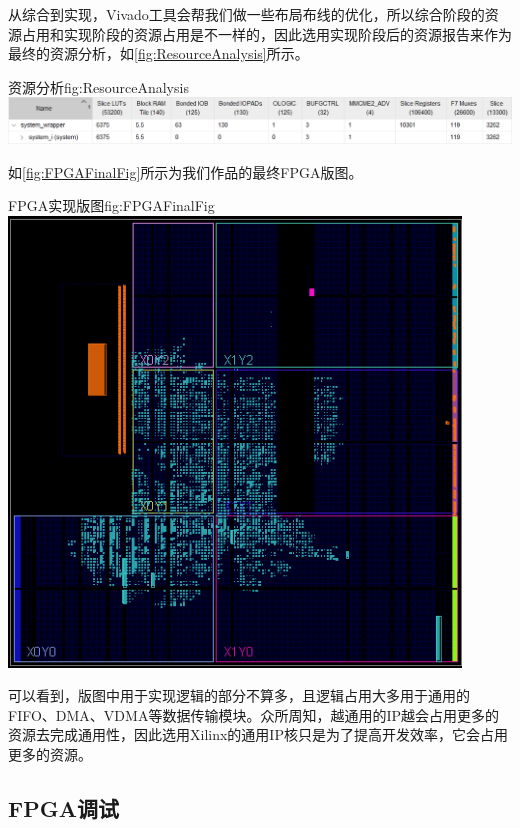 \documentclass[supercite]{HustGraduPaper}
\begin{document}
	从综合到实现，Vivado工具会帮我们做一些布局布线的优化，所以综合阶段的资源占用和实现阶段的资源占用是不一样的，因此选用实现阶段后的资源报告来作为最终的资源分析，如\autoref{fig:ResourceAnalysis}所示。
	
	\begin{generalfig}[htb]{资源分析}{fig:ResourceAnalysis}
		\includegraphics[width=\textwidth]{Figures/ResourceAnalysis.png}
	\end{generalfig}
	

	如\autoref{fig:FPGAFinalFig}所示为我们作品的最终FPGA版图。
	
	
	\begin{generalfig}[htb]{FPGA实现版图}{fig:FPGAFinalFig}
		\includegraphics[width=12cm]{Figures/FPGAFinalFig.png}
	\end{generalfig}

	可以看到，版图中用于实现逻辑的部分不算多，且逻辑占用大多用于通用的FIFO、DMA、VDMA等数据传输模块。众所周知，越通用的IP越会占用更多的资源去完成通用性，因此选用Xilinx的通用IP核只是为了提高开发效率，它会占用更多的资源。
	
	\subsection{FPGA调试}
	
\end{document}
